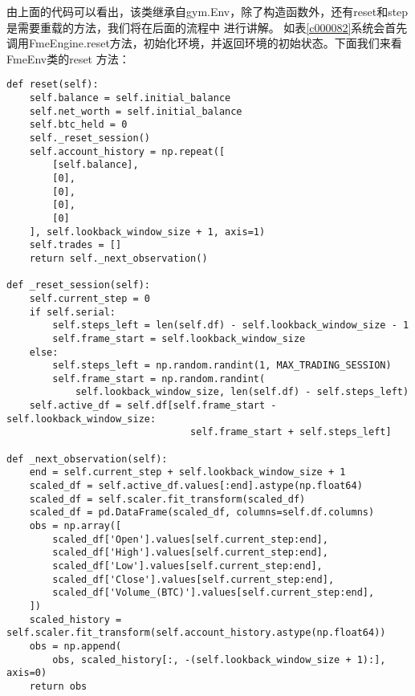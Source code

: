 \documentclass{article}
\begin{document}
由上面的代码可以看出，该类继承自gym.Env，除了构造函数外，还有reset和step是需要重载的方法，我们将在后面的流程中
进行讲解。\newline
如表\ref{c000082}系统会首先调用FmeEngine.reset方法，初始化环境，并返回环境的初始状态。下面我们来看FmeEnv类的reset
方法：
\begin{lstlisting}
def reset(self):
    self.balance = self.initial_balance
    self.net_worth = self.initial_balance
    self.btc_held = 0
    self._reset_session()
    self.account_history = np.repeat([
        [self.balance],
        [0],
        [0],
        [0],
        [0]
    ], self.lookback_window_size + 1, axis=1)
    self.trades = []
    return self._next_observation()

def _reset_session(self):
    self.current_step = 0
    if self.serial:
        self.steps_left = len(self.df) - self.lookback_window_size - 1
        self.frame_start = self.lookback_window_size
    else:
        self.steps_left = np.random.randint(1, MAX_TRADING_SESSION)
        self.frame_start = np.random.randint(
            self.lookback_window_size, len(self.df) - self.steps_left)
    self.active_df = self.df[self.frame_start - self.lookback_window_size:
                                self.frame_start + self.steps_left]

def _next_observation(self):
    end = self.current_step + self.lookback_window_size + 1
    scaled_df = self.active_df.values[:end].astype(np.float64)
    scaled_df = self.scaler.fit_transform(scaled_df)
    scaled_df = pd.DataFrame(scaled_df, columns=self.df.columns)
    obs = np.array([
        scaled_df['Open'].values[self.current_step:end],
        scaled_df['High'].values[self.current_step:end],
        scaled_df['Low'].values[self.current_step:end],
        scaled_df['Close'].values[self.current_step:end],
        scaled_df['Volume_(BTC)'].values[self.current_step:end],
    ])
    scaled_history = self.scaler.fit_transform(self.account_history.astype(np.float64))
    obs = np.append(
        obs, scaled_history[:, -(self.lookback_window_size + 1):], axis=0)
    return obs
\end{lstlisting}
\end{document}
